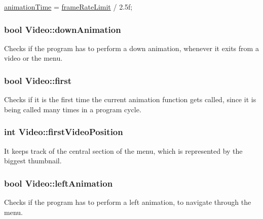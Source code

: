 \begin{DoxyCode}
\hyperlink{classVideo_a76be94d2c8b95d4d3151fe1fdd00155b}{animationTime} = \hyperlink{Global_8h_aa6ad98e2da98fc8f04c67ddab2575bcc}{frameRateLimit} / 2.5f;
\end{DoxyCode}
\subsubsection[{\texorpdfstring{down\+Animation}{downAnimation}}]{\setlength{\rightskip}{0pt plus 5cm}bool Video\+::down\+Animation\hspace{0.3cm}{\ttfamily [private]}}\hypertarget{classVideo_aec0e8ade42cb0336539857309f1329ee}{}\label{classVideo_aec0e8ade42cb0336539857309f1329ee}
Checks if the program has to perform a down animation, whenever it exits from a video or the menu. 
\subsubsection[{\texorpdfstring{first}{first}}]{\setlength{\rightskip}{0pt plus 5cm}bool Video\+::first\hspace{0.3cm}{\ttfamily [private]}}\hypertarget{classVideo_a8d16cd62917d62c5cda8df87f968c9be}{}\label{classVideo_a8d16cd62917d62c5cda8df87f968c9be}
Checks if it is the first time the current animation function gets called, since it is being called many times in a program cycle. 
\subsubsection[{\texorpdfstring{first\+Video\+Position}{firstVideoPosition}}]{\setlength{\rightskip}{0pt plus 5cm}int Video\+::first\+Video\+Position\hspace{0.3cm}{\ttfamily [private]}}\hypertarget{classVideo_a1061f9cbb975530d37e5ef0be54b386a}{}\label{classVideo_a1061f9cbb975530d37e5ef0be54b386a}
It keeps track of the central section of the menu, which is represented by the biggest thumbnail. 
\subsubsection[{\texorpdfstring{left\+Animation}{leftAnimation}}]{\setlength{\rightskip}{0pt plus 5cm}bool Video\+::left\+Animation\hspace{0.3cm}{\ttfamily [private]}}\hypertarget{classVideo_a9cc3dcc22a6e20b9f1dbc6340386c5d0}{}\label{classVideo_a9cc3dcc22a6e20b9f1dbc6340386c5d0}
Checks if the program has to perform a left animation, to navigate through the menu. 
